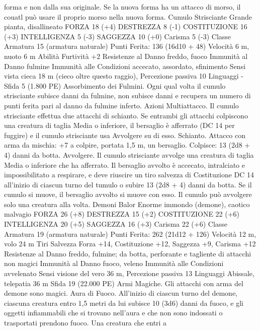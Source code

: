 \begin{multicols}{2}
forma e non dalla sua originale. Se la nuova forma ha un attacco di
morso, il couatl può usare il proprio morso nella nuova forma.
Cumulo Strisciante
Grande pianta, disallineato
FORZA 18 (+4)
DESTREZZA 8 (-1)
COSTITUZIONE 16 (+3)
INTELLIGENZA 5 (-3)
SAGGEZZA 10 (+0)
Carisma 5 (-3)
Classe Armatura 15 (armatura naturale)
\hspace*{0pt}\hfill{Punti Ferita}: 136 (16d10 + 48)
Velocità 6 m, nuoto 6 m
Abilità Furtività +2
Resistenze al Danno freddo, fuoco
Immunità al Danno fulmine
Immunità alle Condizioni accecato, assordato, sfinimento
Sensi vista cieca 18 m (cieco oltre questo raggio), Percezione
passiva 10
Linguaggi -
Sfida 5 (1.800 PE)
Assorbimento dei Fulmini. Ogni qual volta il cumulo strisciante
subisce danni da fulmine, non subisce danni e recupera un
numero di punti ferita pari al danno da fulmine inferto.
Azioni
Multiattacco. Il cumulo strisciante effettua due attacchi di
schianto. Se entrambi gli attacchi colpiscono una creatura di
taglia Media o inferiore, il bersaglio è afferrato (DC 14 per
fuggire) e il cumulo strisciante usa Avvolgere su di esso.
Schianto. Attacco con arma da mischia: +7 a colpire, portata 1,5
m, un bersaglio.
Colpisce: 13 (2d8 + 4) danni da botta.
Avvolgere. Il cumulo strisciante avvolge una creatura di taglia
Media o inferiore che ha afferrato. Il bersaglio avvolto è
accecato, intralciato e impossibilitato a respirare, e deve riuscire
un tiro salvezza di Costituzione DC 14 all’inizio di ciascun turno
del tumulo o subire 13 (2d8 + 4) danni da botta. Se il cumulo
si muove, il bersaglio avvolto si muove con esso. Il cumulo può
avvolgere solo una creatura alla volta.
Demoni
Balor
Enorme immondo (demone), caotico malvagio
FORZA 26 (+8)
DESTREZZA 15 (+2)
COSTITUZIONE 22 (+6)
INTELLIGENZA 20 (+5)
SAGGEZZA 16 (+3)
Carisma 22 (+6)
Classe Armatura 19 (armatura naturale)
\hspace*{0pt}\hfill{Punti Ferita}: 262 (21d12 + 126)
Velocità 12 m, volo 24 m
Tiri Salvezza Forza +14, Costituzione +12, Saggezza +9,
Carisma +12
Resistenze al Danno freddo, fulmine; da botta, perforante e
tagliente di attacchi non magici
Immunità al Danno fuoco, veleno
Immunità alle Condizioni avvelenato
Sensi visione del vero 36 m, Percezione passiva 13
Linguaggi Abissale, telepatia 36 m
Sfida 19 (22.000 PE)
Armi Magiche. Gli attacchi con arma del demone sono magici.
Aura di Fuoco. All’inizio di ciascun turno del demone, ciascuna
creatura entro 1,5 metri da lui subisce 10 (3d6) danni da fuoco, e
gli oggetti infiammabili che si trovano nell’aura e che non sono
indossati o trasportati prendono fuoco. Una creatura che entri a

\end{multicols}
